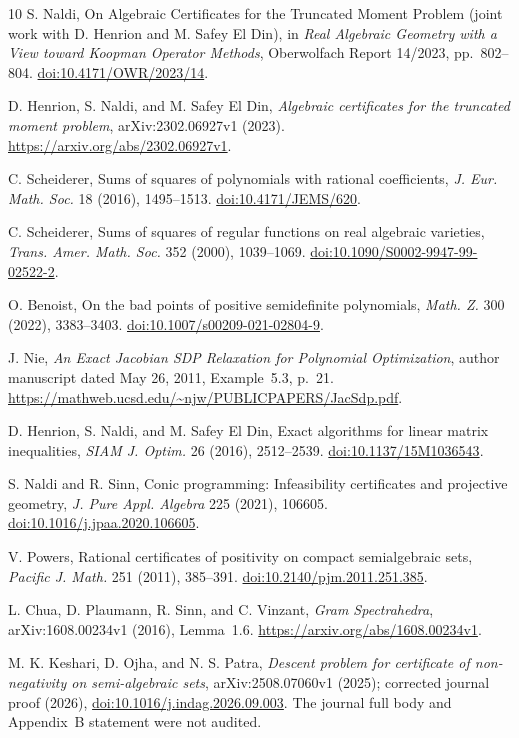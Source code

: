 \documentclass[11pt]{article}
\begin{document}
\begin{thebibliography}{10}
S. Naldi, On Algebraic Certificates for the Truncated Moment Problem
(joint work with D. Henrion and M. Safey El Din),
in \emph{Real Algebraic Geometry with a View toward Koopman Operator Methods},
Oberwolfach Report 14/2023, pp.~802--804.
\href{https://doi.org/10.4171/OWR/2023/14}{doi:10.4171/OWR/2023/14}.

D. Henrion, S. Naldi, and M. Safey El Din,
\emph{Algebraic certificates for the truncated moment problem},
arXiv:2302.06927v1 (2023).
\url{https://arxiv.org/abs/2302.06927v1}.

C. Scheiderer, Sums of squares of polynomials with rational coefficients,
\emph{J. Eur. Math. Soc.} 18 (2016), 1495--1513.
\href{https://doi.org/10.4171/JEMS/620}{doi:10.4171/JEMS/620}.

C. Scheiderer, Sums of squares of regular functions on real algebraic varieties,
\emph{Trans. Amer. Math. Soc.} 352 (2000), 1039--1069.
\href{https://doi.org/10.1090/S0002-9947-99-02522-2}{doi:10.1090/S0002-9947-99-02522-2}.

O. Benoist, On the bad points of positive semidefinite polynomials,
\emph{Math. Z.} 300 (2022), 3383--3403.
\href{https://doi.org/10.1007/s00209-021-02804-9}{doi:10.1007/s00209-021-02804-9}.

J. Nie, \emph{An Exact Jacobian SDP Relaxation for Polynomial Optimization},
author manuscript dated May 26, 2011, Example~5.3, p.~21.
\url{https://mathweb.ucsd.edu/~njw/PUBLICPAPERS/JacSdp.pdf}.

D. Henrion, S. Naldi, and M. Safey El Din,
Exact algorithms for linear matrix inequalities,
\emph{SIAM J. Optim.} 26 (2016), 2512--2539.
\href{https://doi.org/10.1137/15M1036543}{doi:10.1137/15M1036543}.

S. Naldi and R. Sinn, Conic programming: Infeasibility certificates and
projective geometry, \emph{J. Pure Appl. Algebra} 225 (2021), 106605.
\href{https://doi.org/10.1016/j.jpaa.2020.106605}{doi:10.1016/j.jpaa.2020.106605}.

V. Powers, Rational certificates of positivity on compact semialgebraic sets,
\emph{Pacific J. Math.} 251 (2011), 385--391.
\href{https://doi.org/10.2140/pjm.2011.251.385}{doi:10.2140/pjm.2011.251.385}.

L. Chua, D. Plaumann, R. Sinn, and C. Vinzant,
\emph{Gram Spectrahedra}, arXiv:1608.00234v1 (2016), Lemma~1.6.
\url{https://arxiv.org/abs/1608.00234v1}.

M. K. Keshari, D. Ojha, and N. S. Patra,
\emph{Descent problem for certificate of non-negativity on semi-algebraic sets},
arXiv:2508.07060v1 (2025); corrected journal proof (2026),
\href{https://doi.org/10.1016/j.indag.2026.09.003}{doi:10.1016/j.indag.2026.09.003}.
The journal full body and Appendix~B statement were not audited.
\end{thebibliography}
\end{document}
